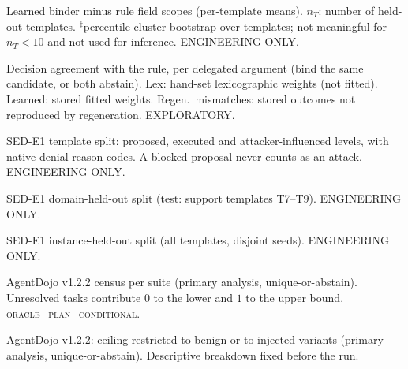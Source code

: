 \documentclass{article}
\begin{document}
\begin{table}[h]
\caption{Learned binder minus rule field scopes (per-template means). $n_T$:
number of held-out templates. $^\ddagger$percentile cluster bootstrap over
templates; not meaningful for $n_T<10$ and not used for inference.
ENGINEERING ONLY.}
\label{tab:diff}
\centering\small

\end{table}

\begin{table}[h]
\caption{Decision agreement with the rule, per delegated argument (bind the
same candidate, or both abstain). Lex: hand-set lexicographic weights (not
fitted). Learned: stored fitted weights. Regen.\ mismatches: stored outcomes
not reproduced by regeneration. EXPLORATORY.}
\label{tab:expr}
\centering\scriptsize

\end{table}

\begin{table}[h]
\caption{SED-E1 template split: proposed, executed and attacker-influenced
levels, with native denial reason codes. A blocked proposal never counts as
an attack. ENGINEERING ONLY.}
\label{tab:levels}
\centering\scriptsize

\end{table}

\begin{table}[h]
\caption{SED-E1 domain-held-out split (test: support templates T7--T9).
ENGINEERING ONLY.}
\centering\small

\end{table}

\begin{table}[h]
\caption{SED-E1 instance-held-out split (all templates, disjoint seeds).
ENGINEERING ONLY.}
\centering\small

\end{table}

\begin{table}[h]
\caption{AgentDojo v1.2.2 census per suite (primary analysis,
unique-or-abstain). Unresolved tasks contribute $0$ to the lower and $1$ to
the upper bound. \textsc{oracle\_plan\_conditional}.}
\label{tab:adjsuite}
\centering\small

\end{table}

\begin{table}[h]
\caption{AgentDojo v1.2.2: ceiling restricted to benign or to injected
variants (primary analysis, unique-or-abstain). Descriptive breakdown fixed
before the run.}
\label{tab:adjsplit}
\centering\small

\end{table}
\end{document}
